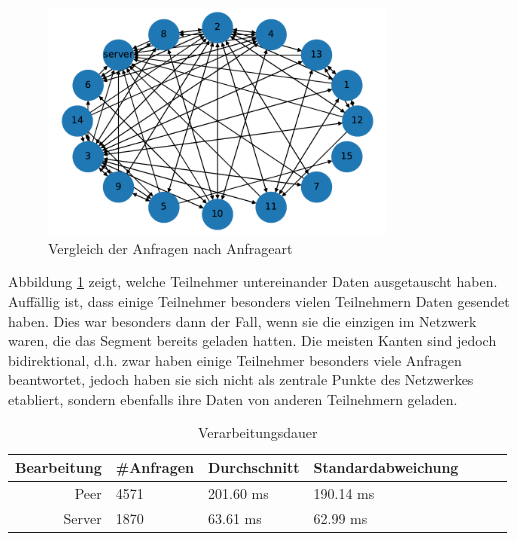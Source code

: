 \begin{figure}[!h]
	\centering
	\includegraphics[width=0.8\textwidth]{figures/15_clients_network}
	\caption[A Figure Short-Title]{Vergleich der Anfragen nach Anfrageart}
	\label{fig:15_clients_network}
\end{figure}

Abbildung \ref{fig:15_clients_network} zeigt, welche Teilnehmer untereinander Daten ausgetauscht haben. Auffällig ist, dass einige Teilnehmer besonders vielen Teilnehmern Daten gesendet haben. Dies war besonders dann der Fall, wenn sie die einzigen im Netzwerk waren, die das Segment bereits geladen hatten. Die meisten Kanten sind jedoch bidirektional, d.h. zwar haben einige Teilnehmer besonders viele Anfragen beantwortet, jedoch haben sie sich nicht als zentrale Punkte des Netzwerkes etabliert, sondern ebenfalls ihre Daten von anderen Teilnehmern geladen.  

\begin{table}[!htb]
\begin{center}

	\begin{tabular}{|r|l|l|l|l|l|l|}
		\hline
		Bearbeitung	 & #Anfragen 	& Durchschnitt 	& Standardabweichung \\ \hline %
		Peer 		& 4571 				& 201.60	 ms	  	& 190.14	 ms	\\ \hline %
		Server 		& 1870		 		& 63.61 ms		& 62.99	ms	\\ %
		\hline
	\end{tabular}
	\caption{Verarbeitungsdauer}
\end{center}

\end{table}

